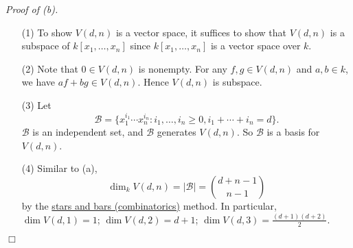 \documentclass{article}
\begin{document}
\emph{Proof of (b).}
\begin{enumerate}
\item[(1)]
  To show $V(d,n)$ is a vector space,
  it suffices to show that $V(d,n)$ is a subspace of $k[x_1,\ldots,x_n]$
  since $k[x_1,\ldots,x_n]$ is a vector space over $k$.

\item[(2)]
  Note that $0 \in V(d,n)$ is nonempty.
  For any $f, g \in V(d,n)$ and $a, b \in k$, we have $af + bg \in V(d,n)$.
  Hence $V(d,n)$ is subspace.

\item[(3)]
  Let
  \[
    \mathscr{B}
    = \{ x_1^{i_1} \cdots x_n^{i_n}
      : i_1, \ldots, i_n \geq 0, i_1 + \cdots + i_n = d \}.
  \]
  $\mathscr{B}$ is an independent set, and $\mathscr{B}$ generates $V(d,n)$.
  So $\mathscr{B}$ is a basis for $V(d,n)$.

\item[(4)]
  Similar to (a),
  \[
    \dim_k V(d,n) = |\mathscr{B}| = {d+n-1 \choose n-1}
  \]
  by the \href{https://en.wikipedia.org/wiki/Stars_and_bars_%28combinatorics%29}
  {stars and bars (combinatorics)} method.
  In particular,
  $\dim V(d,1) = 1$; $\dim V(d,2) = d+1$; $\dim V(d,3) = \frac{(d+1)(d+2)}{2}$.
\end{enumerate}
$\Box$ \\
\end{document}
